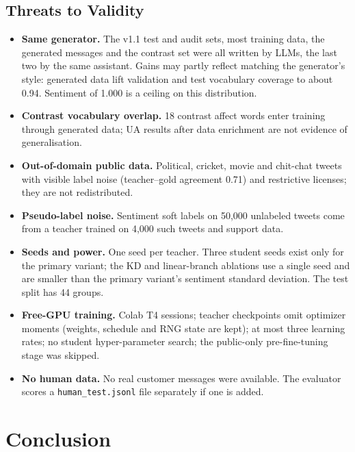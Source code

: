 \documentclass[11pt,a4paper]{article}
\theoremstyle{remark}
\begin{document}
\subsection{Threats to Validity}
\begin{itemize}
  \item \textbf{Same generator.} The v1.1 test and audit sets, most training data, the generated messages and the contrast set were all written by LLMs, the last two by the same assistant. Gains may partly reflect matching the generator's style: generated data lift validation and test vocabulary coverage to about 0.94. Sentiment of 1.000 is a ceiling on this distribution.
  \item \textbf{Contrast vocabulary overlap.} 18 contrast affect words enter training through generated data; UA results after data enrichment are not evidence of generalisation.
  \item \textbf{Out-of-domain public data.} Political, cricket, movie and chit-chat tweets with visible label noise (teacher--gold agreement 0.71) and restrictive licenses; they are not redistributed.
  \item \textbf{Pseudo-label noise.} Sentiment soft labels on 50{,}000 unlabeled tweets come from a teacher trained on 4{,}000 such tweets and support data.
  \item \textbf{Seeds and power.} One seed per teacher. Three student seeds exist only for the primary variant; the KD and linear-branch ablations use a single seed and are smaller than the primary variant's sentiment standard deviation. The test split has 44 groups.
  \item \textbf{Free-GPU training.} Colab T4 sessions; teacher checkpoints omit optimizer moments (weights, schedule and RNG state are kept); at most three learning rates; no student hyper-parameter search; the public-only pre-fine-tuning stage was skipped.
  \item \textbf{No human data.} No real customer messages were available. The evaluator scores a \texttt{human\_test.jsonl} file separately if one is added.
\end{itemize}


\section{Conclusion}
\label{sec:conclusion}
\end{document}
